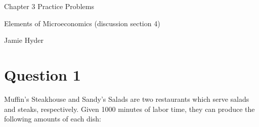 \documentclass[12pt]{article}
\begin{document}
\begin{center}
\Large Chapter 3 Practice Problems

\medskip

\normalsize Elements of Microeconomics (discussion section 4)

\medskip

\small Jamie Hyder
\end{center}

\medskip

\section*{Question 1}

Muffin's Steakhouse and Sandy's Salads are two restaurants which serve salads and steaks, respectively. Given 1000 minutes of labor time, they can produce the following amounts of each dish:


\end{document}
